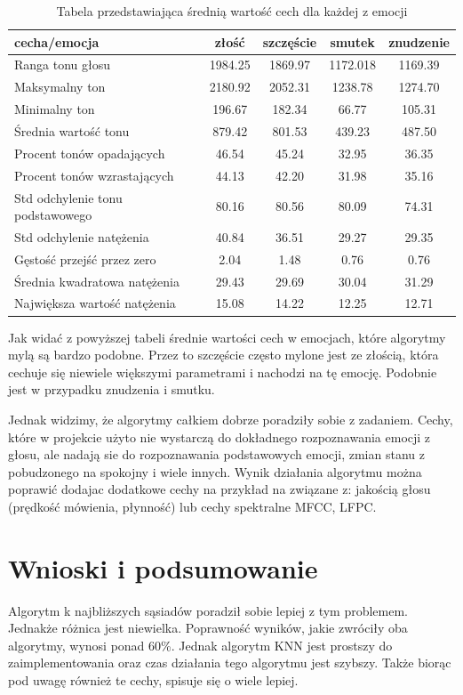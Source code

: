 \documentclass[declaration,shortabstract]{iithesis}
\begin{document}
\begin{table}[!htbp]
\caption{Tabela przedstawiająca średnią wartość cech dla każdej z emocji}
  \begin{tabular}{|l|c|c|c|c|}
    \hline
    cecha/emocja & złość & szczęście & smutek & znudzenie \\ \hline
    Ranga tonu głosu & 1984.25 & 1869.97 & 1172.018 & 1169.39 \\ \hline
    Maksymalny ton & 2180.92 & 2052.31 & 1238.78 & 1274.70\\ \hline
    Minimalny ton & 196.67 & 182.34 & 66.77 & 105.31 \\ \hline
    Średnia wartość tonu & 879.42 & 801.53 & 439.23 & 487.50\\ \hline
	Procent tonów opadających & 46.54 & 45.24 & 32.95 & 36.35 \\ \hline
	Procent tonów wzrastających & 44.13 & 42.20 & 31.98 & 35.16 \\ \hline
	Std odchylenie tonu podstawowego & 80.16 & 80.56 & 80.09 & 74.31 \\ \hline
	Std odchylenie natężenia & 40.84 & 36.51 & 29.27 & 29.35 \\ \hline
	Gęstość przejść przez zero & 2.04 & 1.48 & 0.76 & 0.76 \\ \hline
	Średnia kwadratowa natężenia & 29.43 & 29.69 & 30.04 & 31.29 \\ \hline
	Największa wartość natężenia & 15.08 & 14.22 & 12.25 & 12.71 \\ \hline
  \end{tabular}
\end{table}

Jak widać z powyższej tabeli średnie wartości cech w emocjach, które algorytmy mylą są bardzo podobne. Przez to szczęście często mylone jest ze złością, która cechuje się niewiele większymi parametrami i nachodzi na tę emocję. Podobnie jest w przypadku znudzenia i smutku. 

Jednak widzimy, że algorytmy całkiem dobrze poradziły sobie z zadaniem. Cechy, które w projekcie użyto nie wystarczą do dokładnego rozpoznawania emocji z głosu, ale nadają sie do rozpoznawania podstawowych emocji, zmian stanu z pobudzonego na spokojny i wiele innych. Wynik działania algorytmu można poprawić dodajac dodatkowe cechy na przykład na związane z: jakością głosu (prędkość mówienia, płynność) lub cechy spektralne MFCC, LFPC. 

\chapter{Wnioski i podsumowanie}
Algorytm k najbliższych sąsiadów poradził sobie lepiej z tym problemem. Jednakże różnica jest niewielka. Poprawność wyników, jakie zwróciły oba algorytmy, wynosi ponad 60\%. Jednak algorytm KNN jest prostszy do zaimplementowania oraz czas działania tego algorytmu jest szybszy. Także biorąc pod uwagę również te cechy, spisuje się o wiele lepiej.
\end{document}
